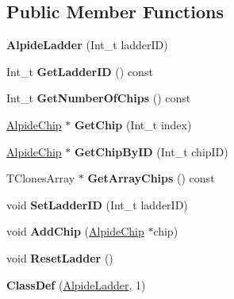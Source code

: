 \subsection*{Public Member Functions}
\begin{DoxyCompactItemize}
\item 
\mbox{\label{class_alpide_ladder_a1eb68d4bca9be56454bb038050dcb636}} 
{\bfseries Alpide\+Ladder} (Int\+\_\+t ladder\+ID)
\item 
\mbox{\label{class_alpide_ladder_a094c6b21c41939556b6e2bc0e558a954}} 
Int\+\_\+t {\bfseries Get\+Ladder\+ID} () const
\item 
\mbox{\label{class_alpide_ladder_a6c897e52319dbf198e03399da9c2b006}} 
Int\+\_\+t {\bfseries Get\+Number\+Of\+Chips} () const
\item 
\mbox{\label{class_alpide_ladder_a8c2000138b09528cf1b1a6237cd655d4}} 
\mbox{\hyperlink{class_alpide_chip}{Alpide\+Chip}} $\ast$ {\bfseries Get\+Chip} (Int\+\_\+t index)
\item 
\mbox{\label{class_alpide_ladder_a14c0d9e30712e27aac188a07698ab98f}} 
\mbox{\hyperlink{class_alpide_chip}{Alpide\+Chip}} $\ast$ {\bfseries Get\+Chip\+By\+ID} (Int\+\_\+t chip\+ID)
\item 
\mbox{\label{class_alpide_ladder_a304b609bc2214bcaaa20ecc02059c087}} 
T\+Clones\+Array $\ast$ {\bfseries Get\+Array\+Chips} () const
\item 
\mbox{\label{class_alpide_ladder_a98ddc66d0678fd44709888bde9a48015}} 
void {\bfseries Set\+Ladder\+ID} (Int\+\_\+t ladder\+ID)
\item 
\mbox{\label{class_alpide_ladder_a5d93d03f5253d92396e21e4f0cc6b309}} 
void {\bfseries Add\+Chip} (\mbox{\hyperlink{class_alpide_chip}{Alpide\+Chip}} $\ast$chip)
\item 
\mbox{\label{class_alpide_ladder_ad4538b416fc063cf2a48a5ba5df65122}} 
void {\bfseries Reset\+Ladder} ()
\item 
\mbox{\label{class_alpide_ladder_af6d0c45740ade18d0a8bde8a90898d5b}} 
{\bfseries Class\+Def} (\mbox{\hyperlink{class_alpide_ladder}{Alpide\+Ladder}}, 1)
\end{DoxyCompactItemize}
